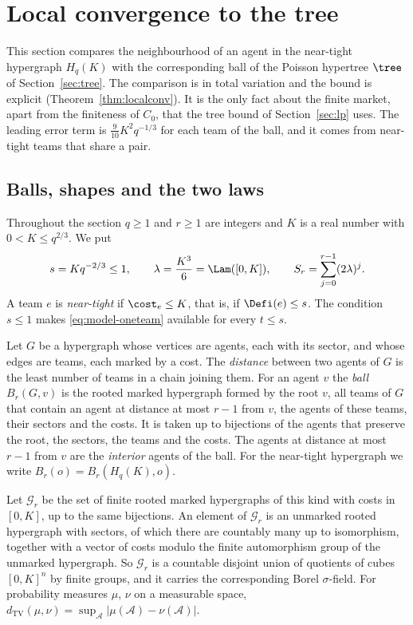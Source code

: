 \section{Local convergence to the tree}\label{sec:localconv}

This section compares the neighbourhood of an agent in the near-tight hypergraph $H_q(K)$
with the corresponding ball of the Poisson hypertree $\tree$ of Section~\ref{sec:tree}. The
comparison is in total variation and the bound is explicit
(Theorem~\ref{thm:localconv}). It is the only fact about the finite market, apart from the
finiteness of $C_0$, that the tree bound of Section~\ref{sec:lp} uses. The leading error
term is $\tfrac9{10}K^2q^{-1/3}$ for each team of the ball, and it comes from near-tight
teams that share a pair.

\subsection{Balls, shapes and the two laws}\label{sec:localconv-setting}

Throughout the section $q\ge1$ and $r\ge1$ are integers and $K$ is a real number with
$0<K\le q^{2/3}$. We put
\[
s=Kq^{-2/3}\le1,\qquad \lambda=\frac{K^3}{6}=\Lam([0,K]),\qquad
S_r=\sum_{j=0}^{r-1}(2\lambda)^j .
\]
A team $e$ is \emph{near-tight} if $\cost_e\le K$, that is, if $\Defi(e)\le s$. The
condition $s\le1$ makes \eqref{eq:model-oneteam} available for every $t\le s$.

\begin{definition}\label{def:localconv-ball}
Let $G$ be a hypergraph whose vertices are agents, each with its sector, and whose edges are
teams, each marked by a cost. The \emph{distance} between two agents of $G$ is the least
number of teams in a chain joining them. For an agent $v$ the \emph{ball} $B_r(G,v)$ is the
rooted marked hypergraph formed by the root $v$, all teams of $G$ that contain an agent at
distance at most $r-1$ from $v$, the agents of these teams, their sectors and the costs. It
is taken up to bijections of the agents that preserve the root, the sectors, the teams and
the costs. The agents at distance at most $r-1$ from $v$ are the \emph{interior} agents of
the ball. For the near-tight hypergraph we write $B_r(o)=B_r(H_q(K),o)$.
\end{definition}

Let $\mathcal G_r$ be the set of finite rooted marked hypergraphs of this kind with costs in
$[0,K]$, up to the same bijections. An element of $\mathcal G_r$ is an unmarked rooted
hypergraph with sectors, of which there are countably many up to isomorphism, together with
a vector of costs modulo the finite automorphism group of the unmarked hypergraph. So
$\mathcal G_r$ is a countable disjoint union of quotients of cubes $[0,K]^n$ by finite
groups, and it carries the corresponding Borel $\sigma$-field. For probability measures
$\mu$, $\nu$ on a measurable space, $d_{\mathrm{TV}}(\mu,\nu)=\sup_{\mathcal A}
|\mu(\mathcal A)-\nu(\mathcal A)|$.

